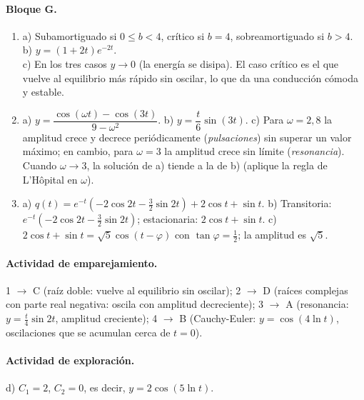 {\paragraph{Bloque G.}
\begin{enumerate}[label=\textbf{G\arabic*.}, leftmargin=*]
    \item a) Subamortiguado si $0\leq b<4$, cr\'itico si $b=4$, sobreamortiguado si $b>4$. \quad b) $y=(1+2t)e^{-2t}$.\\ c) En los tres casos $y\to0$ (la energ\'ia se disipa). El caso cr\'itico es el que vuelve al equilibrio m\'as r\'apido sin oscilar, lo que da una conducci\'on c\'omoda y estable.
    \item a) $y=\dfrac{\cos(\omega t)-\cos(3t)}{9-\omega^2}$. \quad b) $y=\dfrac{t}{6}\sin(3t)$. \quad c) Para $\omega=2{,}8$ la amplitud crece y decrece peri\'odicamente (\emph{pulsaciones}) sin superar un valor m\'aximo; en cambio, para $\omega=3$ la amplitud crece sin l\'imite (\emph{resonancia}). Cuando $\omega\to3$, la soluci\'on de a) tiende a la de b) (aplique la regla de L'H\^opital en $\omega$).
    \item a) $q(t)=e^{-t}\left(-2\cos2t-\frac32\sin2t\right)+2\cos t+\sin t$. \quad b) Transitoria: $e^{-t}\left(-2\cos2t-\frac32\sin2t\right)$; estacionaria: $2\cos t+\sin t$. \quad c) $2\cos t+\sin t=\sqrt5\cos(t-\varphi)$ con $\tan\varphi=\frac12$; la amplitud es $\sqrt5$.
\end{enumerate}

\paragraph{Actividad de emparejamiento.} 1 $\to$ C (ra\'iz doble: vuelve al equilibrio sin oscilar); 2 $\to$ D (ra\'ices complejas con parte real negativa: oscila con amplitud decreciente); 3 $\to$ A (resonancia: $y=\frac{t}{4}\sin 2t$, amplitud creciente); 4 $\to$ B (Cauchy-Euler: $y=\cos(4\ln t)$, oscilaciones que se acumulan cerca de $t=0$).

\paragraph{Actividad de exploraci\'on.} d) $C_1=2$, $C_2=0$, es decir, $y=2\cos(5\ln t)$.
}
